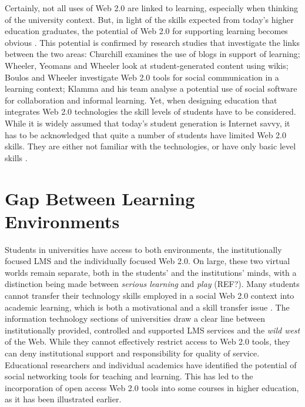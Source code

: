 Certainly, not all uses of Web 2.0 are linked to learning, especially when
thinking of the university context. But, in light of the \LLLs skills expected
from today's higher education graduates, the potential of Web 2.0 for supporting
learning becomes obvious \citep{Tian2011}. This potential is confirmed by
research studies that investigate the links between the two areas: Churchill
\citeyearpar{Churchill2009} examines the use of blogs in support of learning;
Wheeler, Yeomans and Wheeler \citeyearpar{Wheeler2008} look at student-generated
content using wikis; Boulos and Wheeler \citeyearpar{Boulos2007} investigate Web
2.0 tools for social communication in a learning context; Klamma and his team
\citeyearpar{Klamma2007} analyse a potential use of social software for
collaboration and informal learning. Yet, when designing education that
integrates Web 2.0 technologies the skill levels of students have to be
considered. While it is widely assumed that today's student generation is
Internet savvy, it has to be acknowledged that quite a number of students have
limited Web 2.0 skills. They are either not familiar with the technologies, or
have only basic level skills \citep{Kennedy2008}.

\section{Gap Between Learning Environments}
Students in universities have access to both environments, the institutionally
focused LMS and the individually focused Web 2.0. On large, these two virtual
worlds remain separate, both in the students' and the institutions' minds, with
a distinction being made between \textit{serious learning} and \textit{play}
(REF?). Many students cannot transfer their technology skills employed in a
social Web 2.0 context into academic learning, which is both a motivational and a skill
transfer issue \citep{Katz2005}. The information technology sections of
universities draw a clear line between institutionally provided, controlled and
supported LMS services and the \textit{wild west} of the Web. While they cannot
effectively restrict access to Web 2.0 tools, they can deny institutional
support and responsibility for quality of service. Educational researchers and
individual academics have identified the potential of social networking tools
for teaching and learning. This has led to the incorporation of open access Web
2.0 tools into some courses in higher education, as it has been illustrated
earlier.

